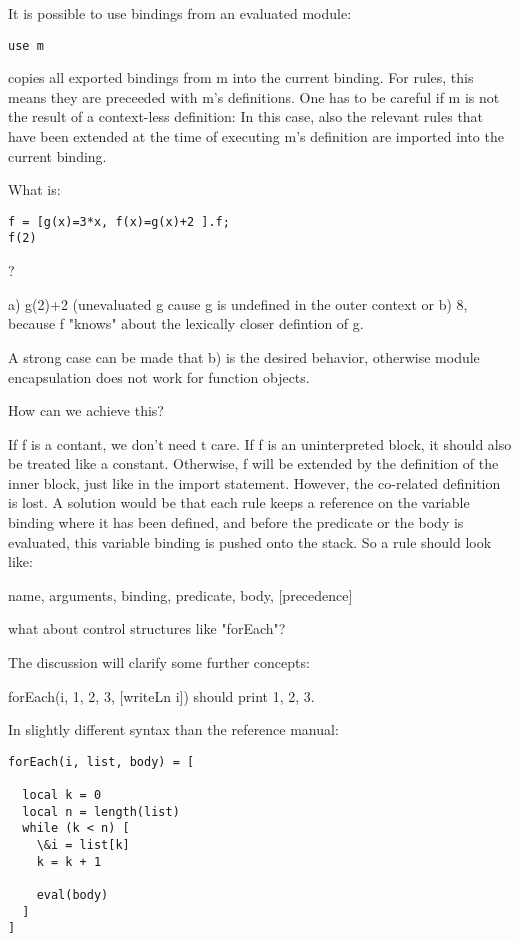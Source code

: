 It is possible to use bindings from an evaluated module:

\begin{verbatim}
use m
\end{verbatim}

copies all exported bindings from m into the current binding.
For rules, this means they are preceeded with m's definitions.
One has to be careful if m is not the result of a context-less
definition: In this case, also the relevant rules that have
been extended at the time of executing m's definition are
imported into the current binding.



What is:

\begin{verbatim}
f = [g(x)=3*x, f(x)=g(x)+2 ].f;
f(2)
\end{verbatim}
?

a) g(2)+2 (unevaluated g cause g is undefined in the outer context or
b) 8, because f "knows" about the lexically closer defintion of g.

A strong case can be made that b) is the desired behavior, otherwise
module encapsulation does not work for function objects.

How can we achieve this?

If f is a contant, we don't need t care. If f is an uninterpreted
block, it should also be treated like a constant.
Otherwise, f will be extended by the definition of the inner block,
just like in the import statement. However, the co-related
definition is lost. A solution would be that each rule keeps
a reference on the variable binding where it has been defined,
and before the predicate or the body is evaluated, this variable
binding is pushed onto the stack. So a rule should look like:

name, arguments, binding, predicate, body, [precedence]


what about control structures like "forEach"?

The discussion will clarify some further concepts:

forEach(i, {1, 2, 3}, [writeLn i]) should print 1, 2, 3.

In slightly different syntax than the reference manual:

\begin{verbatim}
forEach(i, list, body) = [

  local k = 0
  local n = length(list)
  while (k < n) [
    \&i = list[k]
    k = k + 1
    
    eval(body)
  ]
]
\end{verbatim}

